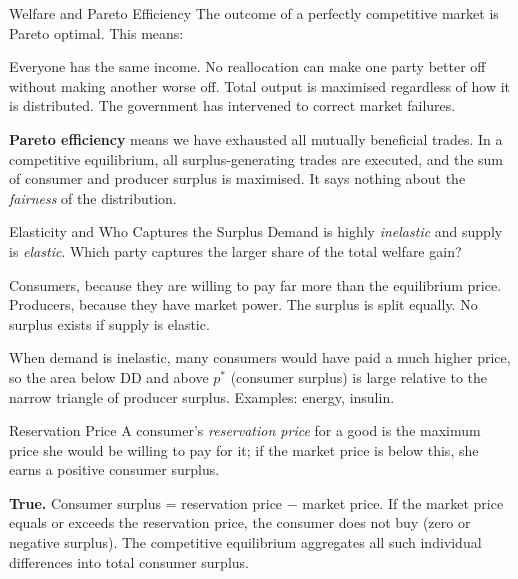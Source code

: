 \documentclass[paper=a5]{scrartcl}
\begin{document}
\begin{question}[type=mc]{Welfare and Pareto Efficiency}
The outcome of a perfectly competitive market is Pareto optimal. This means:
\begin{choices}
  \choice        Everyone has the same income.
  \correctchoice No reallocation can make one party better off without making
                 another worse off.
  \choice        Total output is maximised regardless of how it is distributed.
  \choice        The government has intervened to correct market failures.
\end{choices}
\begin{solution}
  \textbf{Pareto efficiency} means we have exhausted all mutually beneficial
  trades. In a competitive equilibrium, all surplus-generating trades are
  executed, and the sum of consumer and producer surplus is maximised. It says
  nothing about the \emph{fairness} of the distribution.
\end{solution}
\end{question}

\begin{question}[type=mc]{Elasticity and Who Captures the Surplus}
Demand is highly \emph{inelastic} and supply is \emph{elastic}. Which party
captures the larger share of the total welfare gain?
\begin{choices}
  \correctchoice Consumers, because they are willing to pay far more than the
                 equilibrium price.
  \choice        Producers, because they have market power.
  \choice        The surplus is split equally.
  \choice        No surplus exists if supply is elastic.
\end{choices}
\begin{solution}
  When demand is inelastic, many consumers would have paid a much higher price,
  so the area below DD and above $p^*$ (consumer surplus) is large relative to
  the narrow triangle of producer surplus. Examples: energy, insulin.
\end{solution}
\end{question}

\begin{question}[type=tf]{Reservation Price}
A consumer's \emph{reservation price} for a good is the maximum price she
would be willing to pay for it; if the market price is below this, she earns
a positive consumer surplus.
\truefalse[true]
\begin{solution}
  \textbf{True.} Consumer surplus = reservation price $-$ market price. If the
  market price equals or exceeds the reservation price, the consumer does not
  buy (zero or negative surplus). The competitive equilibrium aggregates all
  such individual differences into total consumer surplus.
\end{solution}
\end{question}
\end{document}
